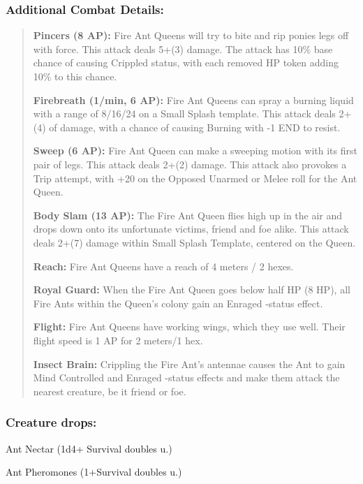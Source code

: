 \documentclass[11pt,a4paper,twocolumn]{book}
\begin{document}
	\subsubsection*{Additional Combat Details:}
	\begin{verse}
		\textbf{Pincers (8 AP):} Fire Ant Queens will try to bite and rip ponies legs off with force. This attack deals 5+(3) damage. The attack has 10\% base chance of causing Crippled status, with each removed HP token adding 10\% to this chance.
		
		\textbf{Firebreath (1/min, 6 AP):} Fire Ant Queens can spray a burning liquid with a range of 8/16/24 on a Small Splash template. This attack deals 2+(4) of damage, with a chance of causing Burning with -1 END to resist.
		
		\textbf{Sweep (6 AP):} Fire Ant Queen can make a sweeping motion with its first pair of legs. This attack deals 2+(2) damage. This attack also provokes a Trip attempt, with +20 on the Opposed Unarmed or Melee roll for the Ant Queen.
		
		\textbf{Body Slam (13 AP):} The Fire Ant Queen flies high up in the air and drops down onto its unfortunate victims, friend and foe alike. This attack deals 2+(7) damage within Small Splash Template, centered on the Queen.
		
		\textbf{Reach:} Fire Ant Queens have a reach of 4 meters / 2 hexes.
		
		\textbf{Royal Guard:} When the Fire Ant Queen goes below half HP (8 HP), all Fire Ants within the Queen's colony gain an Enraged -status effect.
		
		\textbf{Flight:} Fire Ant Queens have working wings, which they use well. Their flight speed is 1 AP for 2 meters/1 hex.
		
		\textbf{Insect Brain:} Crippling the Fire Ant's antennae causes the Ant to gain Mind Controlled and Enraged -status effects and make them attack the nearest creature, be it friend or foe.
	\end{verse}
	
	
	\subsubsection*{Creature drops:}
	\begin{compactitem}
		\item Ant Nectar (1d4+ Survival doubles u.)
		\item Ant Pheromones (1+Survival doubles u.)
	\end{compactitem}
	
\end{document}

